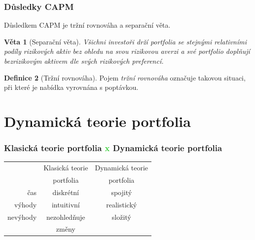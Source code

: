 \documentclass[xcolor=dvipsnames]{beamer}
\newtheorem{veta}{Věta}
\theoremstyle{definition} \newtheorem{definice}[veta]{Definice}
\theoremstyle{remark}
\begin{document}
\begin{frame}
  \frametitle{Důsledky CAPM}
Důsledkem CAPM je \textcolor{OliveGreen}{tržní rovnováha} a \textcolor{OliveGreen}{separační věta}. 

 \begin{veta}[Separační věta]
  Všichni investoři drží portfolia se stejnými relativními podíly rizikových aktiv bez ohledu na svou rizikovou averzi a své portfolio doplňují bezrizikovým aktivem dle svých rizikových preferencí.
 \end{veta}

  \begin{definice}[Tržní rovnováha]
  Pojem \textit{tržní rovnováha} označuje takovou situaci, při které je nabídka vyrovnána s poptávkou.
  \end{definice}
\end{frame}

\section{Dynamická teorie portfolia}

\begin{frame}
  \frametitle{Klasická teorie portfolia \textcolor{LimeGreen}{x} Dynamická teorie portfolia}
 \centering 
 \begin{tabular}{|r||c|c|}  \hline
  & \textcolor{OliveGreen}{Klasická teorie} &\textcolor{OliveGreen}{Dynamická teorie} \\
  & \textcolor{OliveGreen}{portfolia} &\textcolor{OliveGreen}{portfolia} \\
  \hline
   čas & diskrétní & spojitý  \\   \hline
  výhody & intuitivní & realistický  \\   \hline
  nevýhody & nezohledňuje  & složitý  \\
  & změny &   \\ \hline
  \end{tabular}
\end{frame}
\end{document}
